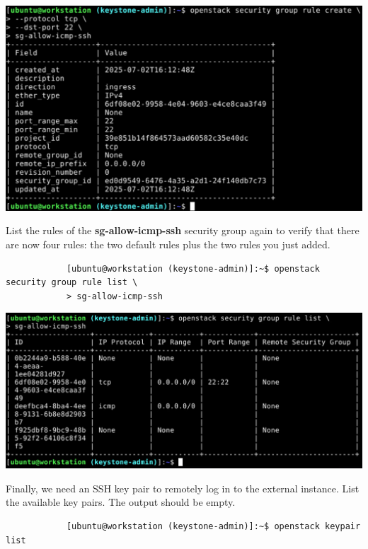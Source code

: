 \documentclass[letterpaper, 12pt]{article}
\begin{document}
\begin{enumerate}
\begin{labstep}
        \begin{center}
            \includegraphics[scale=0.45]{images/part5/step27.png}
        \end{center}
    \end{labstep}

    \begin{labstep}
        List the rules of the \textbf{sg-allow-icmp-ssh} security group again to verify that there are now four rules: the two default rules plus the two rules you just added.
        \begin{lstlisting}
            [ubuntu@workstation (keystone-admin)]:~$ openstack security group rule list \
            > sg-allow-icmp-ssh
        \end{lstlisting}

        \begin{center}
            \includegraphics[width=\linewidth]{images/part5/step28.png}
        \end{center}
    \end{labstep}

    \begin{labstep}
        Finally, we need an SSH key pair to remotely log in to the external instance.
        List the available key pairs.
        The output should be empty.
        \begin{lstlisting}
            [ubuntu@workstation (keystone-admin)]:~$ openstack keypair list
        \end{lstlisting}


\end{labstep}
\end{enumerate}
\end{document}
